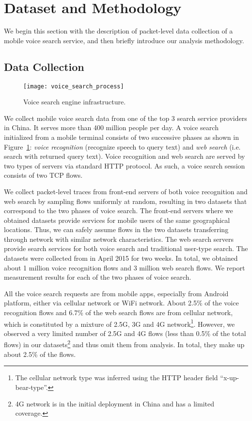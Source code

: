 
\section{Dataset and Methodology}
\label{sec:dataset}

We begin this section with the description of packet-level data collection of a mobile voice search service, and then briefly introduce our analysis methodology.

\subsection{Data Collection}

\begin{figure}[th]
	\centering
	\texttt{[image: voice\_search\_process]}
	\caption{Voice search engine infrastructure.}
	\label{fig:voice_search}
\end{figure}

We collect mobile voice search data from one of the top 3 search service providers in China. It serves more than 400 million people per day. A voice search initialized from a mobile terminal consists of two successive phases as shown in Figure~\ref{fig:voice_search}: \emph{voice recognition} (\ie recognize speech to query text) and \emph{web search} (i.e. search with returned query text). Voice recognition and web search are served by two types of servers via standard HTTP protocol. As such, a voice search session consists of two TCP flows.

We collect packet-level traces from front-end servers of both voice recognition and web search by sampling flows uniformly at random, resulting in two datasets that correspond to the two phases of voice search. The front-end servers where we obtained datasets provide services for mobile users of the same geographical locations. Thus, we can safely assume flows in the two datasets transferring through network with similar network characteristics. The web search servers provide search services for both voice search and traditional user-type search. The datasets were collected from in April 2015 for two weeks. In total, we obtained about 1 million voice recognition flows and 3 million web search flows. We report measurement results for each of the two phases of voice search.

All the voice search requests are from mobile apps, especially from Android platform, either via cellular network or WiFi network. About 2.5\% of the voice recognition flows and 6.7\% of the web search flows are from cellular network, which is constituted by a mixture of 2.5G, 3G and 4G network\footnote{The cellular network type was inferred using the HTTP header field ``x-up-bear-type''.}. However, we observed a very limited number of 2.5G and 4G flows (less than 0.5\% of the total flows) in our datasets\footnote{4G network is in the initial deployment in China and has a limited coverage.} and thus omit them from analysis. In total, they make up about 2.5\% of the flows.


